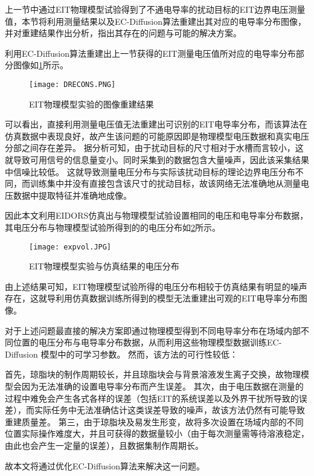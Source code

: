 上一节中通过EIT物理模型试验得到了不通电导率的扰动目标的EIT边界电压测量值，本节将利用测量结果以及EC-Diffusion算法重建出其对应的电导率分布图像，
并对重建结果作出分析，指出其存在的问题与可能的解决方案。

利用EC-Diffusion算法重建出上一节获得的EIT测量电压值所对应的电导率分布部分图像如\cref{figure:DRECONS}所示。
\begin{figure}[h]
    \centering
    \texttt{[image: DRECONS.PNG]}
    \caption{EIT物理模型实验的图像重建结果}
    \label{figure:DRECONS}
\end{figure}

可以看出，直接利用测量电压值无法重建出可识别的EIT电导率分布，而该算法在仿真数据中表现良好，故产生该问题的可能原因即是物理模型电压数据和真实电压分部之间存在差异。
据分析可知，由于扰动目标的尺寸相对于水槽而言较小，这就导致可用信号的信息量变小。同时采集到的数据包含大量噪声，因此该采集结果中信噪比较低。
这就导致测量电压分布与实际该扰动目标的理论边界电压分布不同，而训练集中并没有直接包含该尺寸的扰动目标，故该网络无法准确地从测量电压数据中提取特征并准确地成像。

因此本文利用EIDORS仿真出与物理模型试验设置相同的电压和电导率分布数据，其电压分布与物理模型试验所得到的的电压分布如\cref{figure:expvol}所示。
\begin{figure}[h]
    \centering
    \texttt{[image: expvol.JPG]}
    \caption{EIT物理模型实验与仿真结果的电压分布}
    \label{figure:expvol}
\end{figure}

由上述结果可知，EIT物理模型试验所得的电压分布相较于仿真结果有明显的噪声存在，这就导利用仿真数据训练所得到的模型无法重建出可观的EIT电导率分布图像。

对于上述问题最直接的解决方案即通过物理模型得到不同电导率分布在场域内部不同位置的电压分布与电导率分布数据，从而利用这些物理模型数据训练EC-Diffusion 模型中的可学习参数。
然而，该方法的可行性较低：

首先，琼脂块的制作周期较长，并且琼脂块会与背景溶液发生离子交换，故物理模型会因为无法准确的设置电导率分布而产生误差。
其次，由于电压数据在测量的过程中难免会产生各式各样的误差（包括EIT的系统误差以及外界干扰所导致的误差），而实际任务中无法准确估计这类误差导致的噪声，故该方法仍然有可能导致重建质量差。
第三，由于琼脂块及易发生形变，故将多次设置在场域内部的不同位置实际操作难度大，并且可获得的数据量较小（由于每次测量需等待溶液稳定，由此也会产生一定量的误差），且数据集制作周期长。

故本文将通过优化EC-Diffusion算法来解决这一问题。

